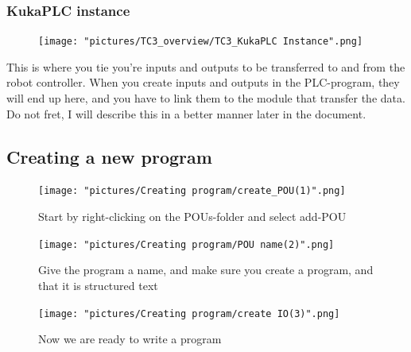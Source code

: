 \documentclass{article}
\begin{document}
\newpage

\subsubsection{KukaPLC instance}
\begin{figure}[!h]
    \centering
    \texttt{[image: "pictures/TC3\_overview/TC3\_KukaPLC Instance".png]}
    \caption{}
    
\end{figure}

This is where you tie you're inputs and outputs to be transferred to and from the robot controller. When you create inputs and outputs in the PLC-program, they will end up here, and you have to link them to the module that transfer the data. Do not fret, I will describe this in a better manner later in the document. 

\newpage

\subsection{Creating a new program}


\begin{figure}[!h]
    \centering
    \texttt{[image: "pictures/Creating program/create\_POU(1)".png]}
    \caption{Start by right-clicking on the POUs-folder and select add-POU}
  
\end{figure}

\begin{figure}[!h]
    \centering
    \texttt{[image: "pictures/Creating program/POU name(2)".png]}
    \caption{Give the program a name, and make sure you create a program, and that it is structured text}
   
\end{figure}

\newpage

\begin{figure}[!h]
    \centering
    \texttt{[image: "pictures/Creating program/create IO(3)".png]}
    \caption{Now we are ready to write a program}
   
\end{figure}
\end{document}
